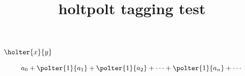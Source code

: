 \documentclass{article}
\title{holtpolt tagging test}
\begin{document}
$\holter{x}{y}$

\[
a_0+\polter{1}{a_1}+\polter{1}{a_2}+\cdots+\polter{1}{a_n}+\cdots
\]
\end{document}
